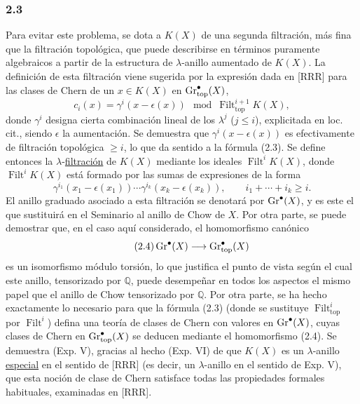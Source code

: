 \subsubsection*{2.3}
Para evitar este problema, se dota a $K(X)$ de una segunda filtración, más
fina que la filtración topológica, que puede describirse en términos
puramente algebraicos a partir de la estructura de $\lambda$-anillo
aumentado de $K(X)$. La definición de esta filtración viene sugerida por la
expresión dada en [RRR] para las clases de Chern de un $x\in K(X)$ en
$\operatorname{Gr}^{\bullet}_{\mathrm{top}}(X)$,
\begin{equation}\tag{2.3}
c_i(x)=\gamma^i(x-\epsilon(x))\mod \operatorname{Filt}^{i+1}_{\mathrm{top}}K(X),
\end{equation}
donde $\gamma^i$ designa cierta combinación lineal de los $\lambda^j$
($j\le i$), explicitada en loc. cit., siendo $\epsilon$ la aumentación. Se
demuestra que $\gamma^i(x-\epsilon(x))$ es efectivamente de filtración
topológica $\ge i$, lo que da sentido a la fórmula (2.3). Se define entonces
la $\lambda$-\underline{filtración} de $K(X)$ mediante los ideales
$\operatorname{Filt}^i K(X)$, donde $\operatorname{Filt}^i K(X)$ está
formado por las sumas de expresiones de la forma
\[
\gamma^{i_1}(x_1-\epsilon(x_1))\cdots \gamma^{i_k}(x_k-\epsilon(x_k)),\qquad i_1+\cdots+i_k\ge i.
\]
El anillo graduado asociado a esta filtración se denotará por
$\operatorname{Gr}^\bullet(X)$, y es este el que sustituirá en el Seminario al anillo de
Chow de $X$. Por otra parte, se puede demostrar que, en el caso aquí
considerado, el homomorfismo canónico
\begin{equation}\tag{2.4}
\operatorname{Gr}^\bullet(X)\longrightarrow \operatorname{Gr}^{\bullet}_{\mathrm{top}}(X)
\end{equation}
es un isomorfismo módulo torsión, lo que justifica el punto de vista según el
cual este anillo, tensorizado por $\mathbb Q$, puede desempeñar en todos los
aspectos el mismo papel que el anillo de Chow tensorizado por $\mathbb Q$.
Por otra parte, se ha hecho exactamente lo necesario para que la fórmula
(2.3) (donde se sustituye $\operatorname{Filt}^i_{\mathrm{top}}$ por
$\operatorname{Filt}^i$) defina una teoría de clases de Chern con valores en
$\operatorname{Gr}^\bullet(X)$, cuyas clases de Chern en
$\operatorname{Gr}^{\bullet}_{\mathrm{top}}(X)$ se deducen mediante el homomorfismo (2.4).
Se demuestra (Exp. V), gracias al hecho (Exp. VI) de que $K(X)$ es un
$\lambda$-anillo \underline{especial} en el sentido de [RRR] (es decir, un
$\lambda$-anillo en el sentido de Exp. V), que esta noción de clase de Chern
satisface todas las propiedades formales habituales, examinadas en [RRR].

